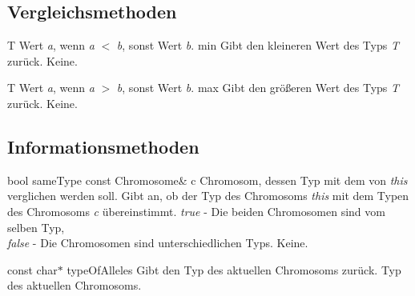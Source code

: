\documentclass{report}
\begin{document}
\subsection{Vergleichsmethoden}
\setNormalInstance
\setCorrectWidthThree{8pt}
\printMethodWithParamsSaved
{T}
{Wert {\em a}, wenn {\em a} $<$ {\em b}, sonst Wert {\em b}.}
{min}
{Gibt den kleineren Wert des Typs {\sl T} zur\"uck.}
{Keine.}
\setCorrectWidthThree{4pt}

\newpage

\setNormalInstance
\setCorrectWidthThree{8pt}
\printMethodWithParamsSaved
{T}
{Wert {\em a}, wenn {\em a} $>$ {\em b}, sonst Wert {\em b}.}
{max}
{Gibt den gr\"o{\ss}eren Wert des Typs {\sl T} zur\"uck.}
{Keine.}
\setCorrectWidthThree{4pt}

\subsection{Informationsmethoden}

    \setConstInstance
    \printMethodWithOneParam
        {bool} 
        {sameType} 
        {const Chromosome\&}
        {c} 
        {Chromosom, dessen Typ mit dem von {\em this} verglichen werden 
         soll.} 
        {Gibt an, ob der Typ des Chromosoms {\em this} mit dem Typen des
         Chromosoms {\em c} \"ubereinstimmt.}
        {{\em true} - Die beiden Chromosomen sind vom selben 
         Typ,\\
         {\em false} - Die Chromosomen sind unterschiedlichen Typs.}
        {Keine.}

\vspace{4ex}

    \printEmptyMethodReturn
    {const char$\ast$} 
    {typeOfAlleles}
    {Gibt den Typ des aktuellen Chromosoms zur\"uck.}
    {Typ des aktuellen Chromosoms.}
\end{document}

